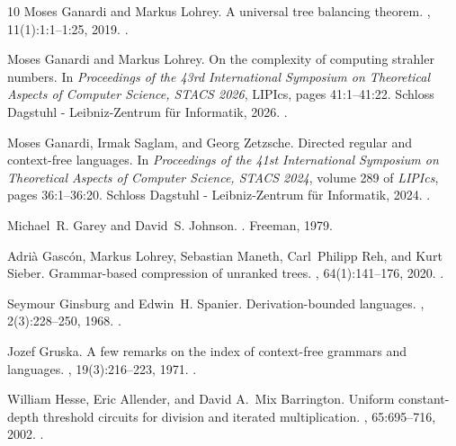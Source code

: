\documentclass[a4paper,UKenglish,cleveref, autoref, thm-restate, numberwithinsect]{lipics-v2021}
\begin{document}
\begin{thebibliography}{10}
Moses Ganardi and Markus Lohrey.
\newblock A universal tree balancing theorem.
, 11(1):1:1--1:25,
  2019.
\newblock \href {https://doi.org/10.1145/3278158} {}.

Moses Ganardi and Markus Lohrey.
\newblock On the complexity of computing strahler numbers.
\newblock In {\em Proceedings of the 43rd International Symposium on
  Theoretical Aspects of Computer Science, {STACS} 2026}, LIPIcs, pages
  41:1--41:22. Schloss Dagstuhl - Leibniz-Zentrum f{\"{u}}r Informatik, 2026.
\newblock \href {https://doi.org/10.4230/LIPICS.STACS.2026.41}
  {}.


Moses Ganardi, Irmak Saglam, and Georg Zetzsche.
\newblock Directed regular and context-free languages.
\newblock In {\em Proceedings of the 41st International Symposium on
  Theoretical Aspects of Computer Science, {STACS} 2024}, volume 289 of {\em
  LIPIcs}, pages 36:1--36:20. Schloss Dagstuhl - Leibniz-Zentrum f{\"{u}}r
  Informatik, 2024.
\newblock \href {https://doi.org/10.4230/LIPICS.STACS.2024.36}
  {}.

Michael~R. Garey and David~S. Johnson.
.
\newblock Freeman, 1979.

Adri{\`{a}} Gasc{\'{o}}n, Markus Lohrey, Sebastian Maneth, Carl~Philipp Reh,
  and Kurt Sieber.
\newblock Grammar-based compression of unranked trees.
, 64(1):141--176, 2020.
\newblock \href {https://doi.org/10.1007/S00224-019-09942-Y}
  {}.

Seymour Ginsburg and Edwin~H. Spanier.
\newblock Derivation-bounded languages.
, 2(3):228--250, 1968.
\newblock \href {https://doi.org/10.1016/S0022-0000(68)80009-1}
  {}.

Jozef Gruska.
\newblock A few remarks on the index of context-free grammars and languages.
, 19(3):216--223, 1971.
\newblock \href {https://doi.org/10.1016/S0019-9958(71)90095-7}
  {}.

William Hesse, Eric Allender, and David A.~Mix Barrington.
\newblock Uniform constant-depth threshold circuits for division and iterated
  multiplication.
, 65:695--716, 2002.
\newblock \href {https://doi.org/10.1016/S0022-0000(02)00025-9}
  {}.


\end{thebibliography}
\end{document}
